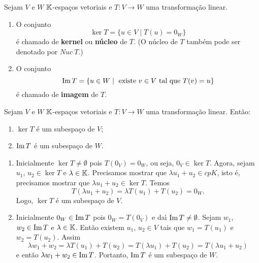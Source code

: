 \begin{definicao}
	Sejam $V$ e $W$ $\mathbb{K}$-espa\c{c}os vetoriais e $T : V \to W$ uma transforma\c{c}\~ao linear.
	\begin{enumerate}
		\item O conjunto
		\[
			\ker T = \{u \in V \mid T(u) = 0_W\}
		\]
		\'e chamado de \textbf{kernel} ou \textbf{n\'ucleo} de $T$. (O n\'ucleo de $T$ tamb\'em pode ser denotado por $Nuc\ T$.)

		\item O conjunto
		\[
			{\rm Im\,} T = \{u \in W \mid \mbox{ existe } v \in V \mbox{ tal que } T(v) = u\}
		\]
		\'e chamado de \textbf{imagem} de $T$.
	\end{enumerate}
\end{definicao}

\begin{proposicao}
	Sejam $V$ e $W$ $\mathbb{K}$-espa\c{c}os vetoriais e $T : V \to W$ uma transforma\c{c}\~ao linear. Ent\~ao:
	\begin{enumerate}
		\item $\ker T$ \'e um subespa\c{c}o de $V$;
		\item ${\rm Im\,} T$ \'e um subespa\c{c}o de $W$.
	\end{enumerate}
\end{proposicao}
\begin{prova}
	\begin{enumerate}
		\item Inicialmente $\ker T \ne \emptyset$ pois $T(0_V) = 0_W$, ou seja, $0_V \in \ker T$. Agora, sejam $u_1$, $u_2 \in \ker T$ e $\lambda \in \mathbb{K}$. Precisamos mostrar que $\lambda u_1 + u_2 \in cp{K}$, isto \'e, precisamos mostrar que $\lambda u_1 + u_2 \in \ker T$. Temos
		\[
			T(\lambda u_1 + u_2) = \lambda T(u_1) + T(u_2) = 0_W.
		\]
		Logo, $\ker T$ \'e um subespa\c{c}o de $V$.

		\item Inicialmente $0_W \in {\rm Im\,} T$ pois $0_W = T(0_V)$ e da{\'\i} ${\rm Im\,} T \ne \emptyset$. Sejam $w_1$, $w_2 \in {\rm Im\,} T$ e $\lambda \in \mathbb{K}$. Ent\~ao existem $u_1$, $u_2 \in V$ tais que $w_1 = T(u_1)$ e $w_2 = T(u_2)$. Assim
		\[
			\lambda w_1 + w_2 = \lambda T(u_1) + T(u_2) = T(\lambda u_1) + T(u_2) = T(\lambda u_1 + u_2)
		\]
		e ent\~ao $\lambda w_1 + w_2 \in {\rm Im\,} T$. Portanto, ${\rm Im\,} T$ \'e um subespa\c{c}o de $W$.
	\end{enumerate}
\end{prova}

